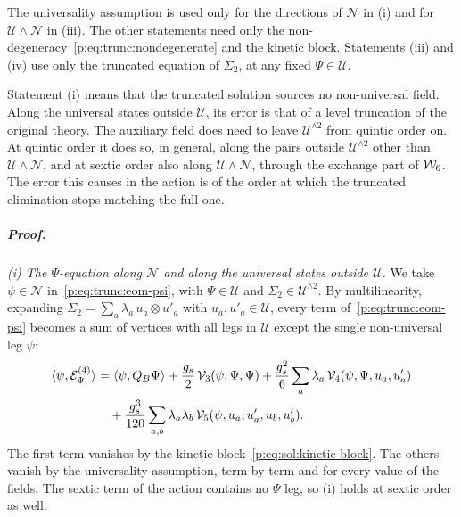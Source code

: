 The universality assumption is used only for the directions of $\mathcal N$ in (i) and for $\mathcal U \wedge \mathcal N$ in (iii).
The other statements need only the non-degeneracy~\eqref{p:eq:trunc:nondegenerate} and the kinetic block.
Statements (iii) and (iv) use only the truncated equation of $\Sigma_2$, at any fixed $\Psi \in \mathcal U$.

Statement (i) means that the truncated solution sources no non-universal field.
Along the universal states outside $\mathcal U$, its error is that of a level truncation of the original theory.
The auxiliary field does need to leave $\mathcal U^{\wedge 2}$ from quintic order on.
At quintic order it does so, in general, along the pairs outside $\mathcal U^{\wedge 2}$ other than $\mathcal U \wedge \mathcal N$, and at sextic order also along $\mathcal U \wedge \mathcal N$, through the exchange part of $\mathcal{W}_{6}$.
The error this causes in the action is of the order at which the truncated elimination stops matching the full one.

\subparagraph{Proof.}

\emph{(i) The $\Psi$-equation along $\mathcal N$ and along the universal states outside $\mathcal U$.}
We take $\psi \in \mathcal N$ in~\eqref{p:eq:trunc:eom-psi}, with $\Psi \in \mathcal U$ and $\Sigma_2 \in \mathcal U^{\wedge 2}$.
By multilinearity, expanding $\Sigma_2 = \sum_a \lambda_a \, u_a \otimes u'_a$ with $u_a, u'_a \in \mathcal U$, every term of~\eqref{p:eq:trunc:eom-psi} becomes a sum of vertices with all legs in $\mathcal U$ except the single non-universal leg $\psi$:
\begin{equation}
\label{p:eq:trunc:psi-outside}
\begin{aligned}
  \braket{\psi, \mathcal E^{(4)}_\Psi}_{}
    &
    = \braket{\psi, Q_B \Psi}_{}
      + \frac{g_s}{2} \, \mathcal{V}_{3}(\psi, \Psi, \Psi)
      + \frac{g_s^2}{6} \sum_a \lambda_a \, \mathcal{V}_{4}(\psi, \Psi, u_a, u'_a)
    \\
    &
    \quad
    + \frac{g_s^3}{120} \sum_{a, b} \lambda_a \lambda_b \, \mathcal{V}_{5}(\psi, u_a, u'_a, u_b, u'_b).
\end{aligned}
\end{equation}
The first term vanishes by the kinetic block~\eqref{p:eq:sol:kinetic-block}.
The others vanish by the universality assumption, term by term and for every value of the fields.
The sextic term of the action contains no $\Psi$ leg, so (i) holds at sextic order as well.

